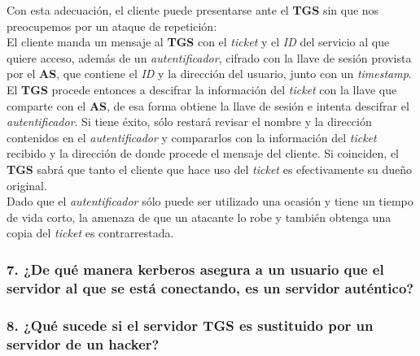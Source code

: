 \documentclass[12pt]{article}
\begin{document}
Con esta adecuación, el cliente puede presentarse ante el \textbf{TGS} sin que nos preocupemos por un ataque de repetición:\\
El cliente manda un mensaje al \textbf{TGS} con el \textit{ticket} y el \textit{ID} del servicio al que quiere acceso, además de un \textit{autentificador}, cifrado con la llave de sesión provista por el \textbf{AS}, que contiene el \textit{ID} y la dirección del usuario, junto con un \textit{timestamp}. El \textbf{TGS} procede entonces a descifrar la información del \textit{ticket} con la llave que comparte con el \textbf{AS}, de esa forma
obtiene la llave de sesión e intenta descifrar el \textit{autentificador}. Si tiene éxito, sólo restará revisar el nombre y la dirección contenidos
en el \textit{autentificador} y compararlos con la información del \textit{ticket} recibido y la dirección de donde procede el mensaje del cliente.
Si coinciden, el \textbf{TGS} sabrá que tanto el cliente que hace uso del \textit{ticket} es efectivamente su dueño original. \\

Dado que el \textit{autentificador} sólo puede ser utilizado una ocasión y tiene un tiempo de vida corto, la amenaza de que un atacante lo robe y también obtenga una copia del \textit{ticket} es contrarrestada.




\subsubsection*{7. ¿De qué manera kerberos asegura a un usuario que el servidor al que se está conectando, es un 
servidor auténtico?}

\subsubsection*{8. ¿Qué sucede si el servidor TGS es sustituido por un servidor de un hacker? }
\end{document}

